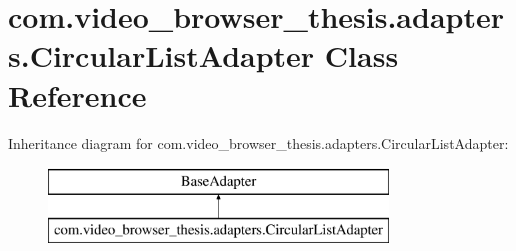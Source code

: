 \hypertarget{classcom_1_1video__browser__thesis_1_1adapters_1_1_circular_list_adapter}{\section{com.\-video\-\_\-browser\-\_\-thesis.\-adapters.\-Circular\-List\-Adapter Class Reference}
\label{classcom_1_1video__browser__thesis_1_1adapters_1_1_circular_list_adapter}
}
Inheritance diagram for com.\-video\-\_\-browser\-\_\-thesis.\-adapters.\-Circular\-List\-Adapter\-:\begin{figure}[H]
\begin{center}
\leavevmode
\includegraphics[height=2.000000cm]{classcom_1_1video__browser__thesis_1_1adapters_1_1_circular_list_adapter}
\end{center}
\end{figure}

